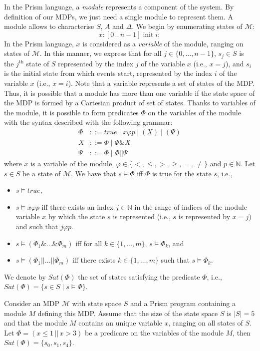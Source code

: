 In the Prism language, a \textit{module} represents a component of the system.
By definition of our MDPs, we just need a single module to
represent them. A module allows to characterise $S$, $A$ and $\Delta$. We begin by enumerating states of $\mathcal{M}$:
\[
  x: [0\, ..\, n-1] \; \text{init} \; i;
\]
In the Prism language, $x$ is considered as a \textit{variable} of the module, ranging on states of $\mathcal{M}$.
In this manner, we express that for all $j \in \{0, \dots, n-1\}$, $s_j \in S$
is the $j^{\text{th}}$ state of $S$ represented by the index $j$ of the variable $x$ (i.e., $x=j$), and $s_i$ is the initial state from which events start, represented by the index $i$ of the variable $x$ (i.e., $x=i$).
Note that a variable represents a set of states of the MDP. Thus, it is possible that a module has more than one variable if the state space of the MDP is formed by a Cartesian product of set of states.
Thanks to variables of the module, it is possible to form predicates $\Phi$ on the variables of the module with the syntax described with the following grammar:
\begin{align*}
  \Phi &::= true \; | \; x \varphi p \; | \; (X) \; | \; (\Psi) \\
  X &::= \Phi \; | \; \Phi \& X \\
  \Psi &::= \Phi \; | \; \Phi || \Psi
\end{align*}
where $x$ is a variable of the module, $\varphi \in \{<, \leq, >, \geq, =, \neq\}$
and $p \in \mathbb{N}$. Let $s \in S$ be a state of $\mathcal{M}$. We have that $s \models \Phi$ iff $\Phi$ is true for the state $s$, i.e.,
\begin{itemize}
  \item $s \models true$,
  \item $s \models x \varphi p$ iff there exists an index $j \in \mathbb{N}$ in the range of indices of the module variable $x$ by which the state $s$ is represented (i.e., $s$ is represented by $x=j$) and such that $j \varphi p$.
  \item $s \models (\Phi_1 \& \dots \& \Phi_m)$ iff
    for all $k \in \{1, \dots, m\}$, $s \models \Phi_k$, and
  \item $s \models (\Phi_1 || \dots || \Phi_m)$ iff
    there exists $k \in \{1, \dots, m\}$ such that $s \models \Phi_k$.
\end{itemize}
We denote by $Sat(\Phi)$ the set of states satisfying the predicate $\Phi$, i.e., $Sat(\Phi) = \{s \in S \; | \; s \models \Phi\}$.

\begin{example} Consider an MDP $\mathcal{M}$ with state space $S$ and a Prism program containing a module $M$ defining this MDP.
Assume that the size of the state space $S$ is $|S| = 5$ and that the module $M$ contains an unique variable $x$, ranging on all states of $S$. Let
$\Phi = (x \leq 1 \,||\, x >3)$ be a predicare on the variables of the module $M$, then $Sat(\Phi) = \{s_0, s_1, s_4\}$.
\end{example}

